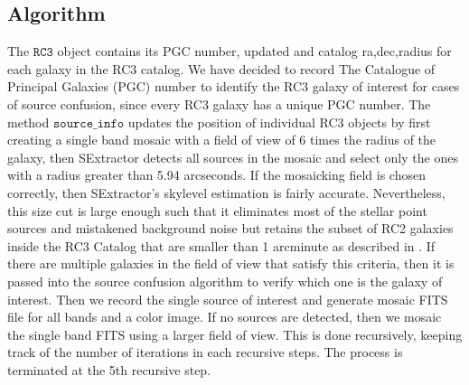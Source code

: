 \documentclass[5p]{elsarticle}
\begin{document}
	\subsection{Algorithm}
	The $\texttt{RC3}$ object contains its  PGC number, updated and catalog ra,dec,radius for each galaxy in the RC3 catalog. We have decided to record The Catalogue of Principal Galaxies (PGC) number to identify the RC3 galaxy of interest for cases of source confusion, since every RC3 galaxy has a unique PGC number. The method $\texttt{source\_info}$ updates the position of individual RC3 objects by first creating a single band mosaic with a field of view of 6 times the radius of the galaxy, then SExtractor detects all sources in the mosaic and select only the ones with a radius greater than 5.94 arcseconds.  If the mosaicking field is chosen correctly, then SExtractor's skylevel estimation is fairly accurate.  Nevertheless, this size cut is large enough such that it eliminates most of the stellar point sources and mistakened background noise  but retains the subset of RC2 galaxies inside the RC3 Catalog that are smaller than 1 arcminute as described in \citet{rc2}. If there are multiple galaxies in the field of view that satisfy this criteria, then it is passed into the source confusion algorithm to verify which one is the galaxy of interest. Then we record the single source of interest and generate mosaic FITS file for all bands and a color image. If no sources are detected, then we mosaic  the single band FITS using a larger field of view. This is done recursively, keeping track of the number of iterations in each recursive steps. The process is terminated at the 5th recursive step. %
\end{document}
